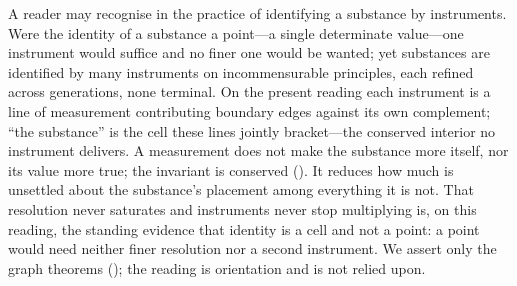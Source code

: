 \begin{remark}
\label{rem:instrument-reading}
A reader may recognise  in the practice of identifying a
substance by instruments. Were the identity of a substance a point---a single
determinate value---one instrument would suffice and no finer one would be wanted;
yet substances are identified by many instruments on incommensurable principles,
each refined across generations, none terminal. On the present reading each
instrument is a line of measurement contributing boundary edges against its own
complement; ``the substance'' is the cell these lines jointly bracket---the
conserved interior no instrument delivers. A measurement does not make the
substance more itself, nor its value more true; the invariant is conserved
(). It reduces how much is unsettled about the
substance's placement among everything it is not. That resolution never saturates
and instruments never stop multiplying is, on this reading, the standing evidence
that identity is a cell and not a point: a point would need neither finer
resolution nor a second instrument. We assert only the graph theorems
(); the reading is
orientation and is not relied upon.
\end{remark}
